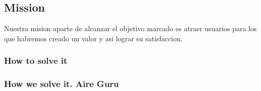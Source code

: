 \subsection{Mission}
Nuestra mision aparte de alcanzar el objetivo marcado es atraer usuarios para los que habremos creado un
valor y asi lograr su satisfaccion.
 

\subsubsection{How to solve it} 


\subsubsection{How we solve it. Aire Guru} 
 
\begin{itemize}
    \done
    \crossed
    
\end{itemize}
\newpage